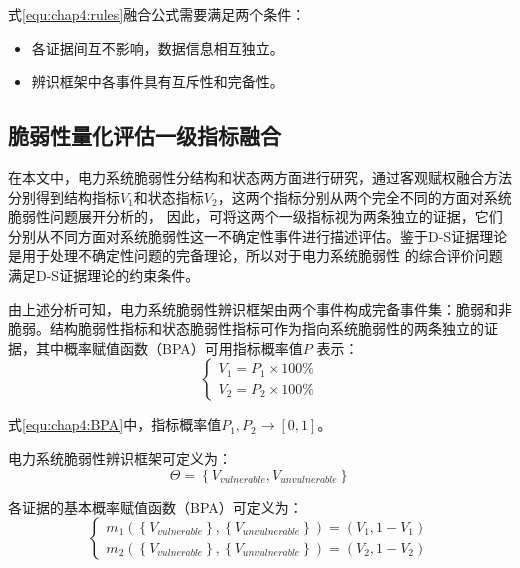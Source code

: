 式\ref{equ:chap4:rules}融合公式需要满足两个条件\cite{refs81}：
\begin{itemize}
  \item 各证据间互不影响，数据信息相互独立。
  \item 辨识框架中各事件具有互斥性和完备性。 
\end{itemize}







\subsection{脆弱性量化评估一级指标融合}
\label{sec:DSdistri}
在本文中，电力系统脆弱性分结构和状态两方面进行研究，通过客观赋权融合方法分别得到结构指标$V_1$和状态指标$V_2$，这两个指标分别从两个完全不同的方面对系统脆弱性问题展开分析的，
因此，可将这两个一级指标视为两条独立的证据，它们分别从不同方面对系统脆弱性这一不确定性事件进行描述评估。鉴于D-S证据理论是用于处理不确定性问题的完备理论，所以对于电力系统脆弱性
的综合评价问题满足D-S证据理论的约束条件。

由上述分析可知，电力系统脆弱性辨识框架由两个事件构成完备事件集：脆弱和非脆弱。结构脆弱性指标和状态脆弱性指标可作为指向系统脆弱性的两条独立的证据，其中概率赋值函数（BPA）可用指标概率值$P$
表示：
\begin{equation}
  \label{equ:chap4:BPA}
\left\{\begin{array}{l}{ V_1 = P_1 \times 100\%} \\ {V_2 = P_2 \times 100\%}\end{array}\right.
\end{equation}

式\ref{equ:chap4:BPA}中，指标概率值$P_1,P_2 \rightarrow \left[0,1\right]$。

电力系统脆弱性辨识框架可定义为：
\begin{equation}
  \Theta = \left\{V_{vulnerable},V_{unvulnerable}\right\}
\end{equation}

各证据的基本概率赋值函数（BPA）可定义为：
\begin{equation}
\left\{\begin{array}{l}{m_1(\left\{V_{vulnerable}\right\},\left\{V_{unvulnerable}\right\}) = (V_{1} , 1-V_{1})} \\ 
{m_2(\left\{V_{vulnerable}\right\},\left\{V_{unvulnerable}\right\}) = (V_{2} , 1-V_{2})}\end{array}\right.
\end{equation}


